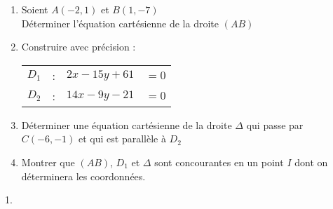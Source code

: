 \begin{enumerate}
\item Soient $A(-2,1)$ et $B(1, -7) $\\
Déterminer l'équation cartésienne de la droite $(AB)$

\item Construire avec précision : 

\begin{tabular}{lccl}
$D_{1}$ & : & $2x -15y +61$ & $= 0 $ \\
$D_{2}$ & : & $14x -9y -21$ & $ = 0 $ \\
\end{tabular}

\item Déterminer une équation cartésienne de la droite $\Delta$ qui passe par $C(-6, -1)$ et qui est parallèle à   $D_{2}$ 

\item Montrer que $(AB)$, $D_{1}$ et $\Delta$ sont concourantes en un point $I$ dont on déterminera les coordonnées.
\end{enumerate}



1. 

